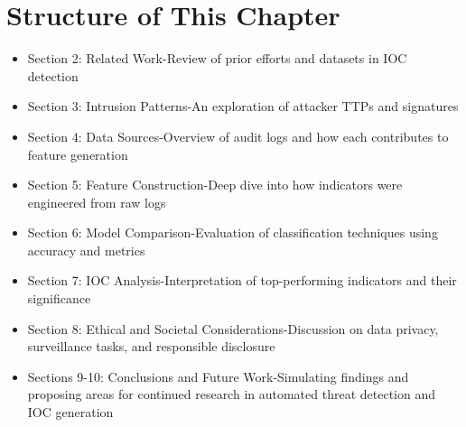 \section{Structure of This Chapter}
\begin{itemize}
    \item Section 2: Related Work-Review of prior efforts and datasets in IOC detection
    \item Section 3: Intrusion Patterns-An exploration of attacker TTPs and signatures
    \item Section 4: Data Sources-Overview of audit logs and how each contributes to feature generation
    \item Section 5: Feature Construction-Deep dive into how indicators were engineered from raw logs
    \item Section 6: Model Comparison-Evaluation of classification techniques using accuracy and metrics
    \item Section 7: IOC Analysis-Interpretation of top-performing indicators and their significance
    \item Section 8: Ethical and Societal Considerations-Discussion on data privacy, surveillance tasks, and responsible disclosure
    \item Sections 9-10: Conclusions and Future Work-Simulating findings and proposing areas for continued research in automated threat detection and IOC generation
    
\end{itemize}
